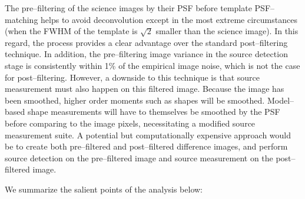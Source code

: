 \documentclass[iop]{emulateapj}
\begin{document}
The pre--filtering of the science images by their PSF before template PSF--matching helps to avoid deconvolution except in the most extreme circumstances (when the FWHM of the template is $\sqrt{2}$ smaller than the science image).
In this regard, the process provides a clear advantage over the standard post--filtering technique.
In addition, the pre--filtering image variance in the source detection stage is consistently within 1\% of the empirical image noise, which is not the case for post--filtering.
However, a downside to this technique is that source measurement must also happen on this filtered image.
Because the image has been smoothed, higher order moments such as shapes will be smoothed.
Model--based shape measurements will have to themselves be smoothed by the PSF before comparing to the image pixels, necessitating a modified source measurement suite.
A potential but computationally expensive approach would be to create both pre--filtered and post--filtered difference images, and perform source detection on the pre--filtered image and source measurement on the post--filtered image.

We summarize the salient points of the analysis below:
\end{document}
